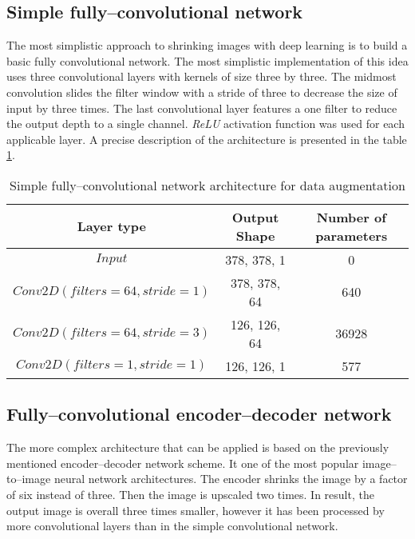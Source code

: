 \subsection{Simple fully--convolutional network}
The most simplistic approach to shrinking images with deep learning is to build a basic fully convolutional network.
The most simplistic implementation of this idea uses three convolutional layers with kernels of size three by three.
The midmost convolution slides the filter window with a stride of three to decrease the size of input by three times.
The last convolutional layer features a one filter to reduce the output depth to a single channel.
\textit{ReLU} activation function was used for each applicable layer.
A precise description of the architecture is presented in the table \ref{tab:simple-conv-arch}.
\begin{table}
    \centering
    \caption{Simple fully--convolutional network architecture for data augmentation}
    \label{tab:simple-conv-arch}
    \begin{tabular}{ccc}
        \toprule
        Layer type & Output Shape & Number of parameters \\
        \midrule
        $ Input $      & 378, 378, 1  & 0                    \\
        $ Conv2D(filters=64, stride=1) $ & 378, 378, 64 & 640 \\
        $ Conv2D(filters=64, stride=3) $ & 126, 126, 64 & 36928 \\
        $ Conv2D(filters=1, stride=1) $ & 126, 126, 1 & 577 \\
        \bottomrule
    \end{tabular}
\end{table}

\subsection{Fully--convolutional encoder--decoder network}
The more complex architecture that can be applied is based on the previously mentioned encoder--decoder network scheme.
It one of the most popular image--to--image neural network architectures.
The encoder shrinks the image by a factor of six instead of three.
Then the image is upscaled two times.
In result, the output image is overall three times smaller, however it has been processed by more convolutional layers than in the simple convolutional network.

